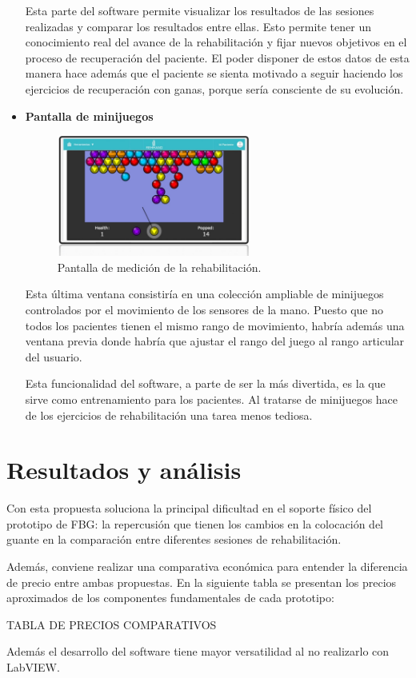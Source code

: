 \begin{itemize}
	Esta parte del software permite visualizar los resultados de las sesiones realizadas y comparar los resultados entre ellas. Esto permite tener un conocimiento real del avance de la rehabilitación y fijar nuevos objetivos en el proceso de recuperación del paciente. El poder disponer de estos datos de esta manera hace además que el paciente se sienta motivado a seguir haciendo los ejercicios de recuperación con ganas, porque sería consciente de su evolución.
	
	
	\item \textbf{Pantalla de minijuegos}
	
	\begin{figure}[H]
		\centering
		\includegraphics[width=0.6\textwidth]{./img/softwareIMU3}
		\caption{Pantalla de medición de la rehabilitación. } 
		\label{fig:softIMU3}
	\end{figure} 
	
	Esta última ventana consistiría en una colección ampliable de minijuegos controlados por el movimiento de los sensores de la mano. Puesto que no todos los pacientes tienen el mismo rango de movimiento, habría además una ventana previa donde habría que ajustar el rango del juego al rango articular del usuario.
	
	Esta funcionalidad del software, a parte de ser la más divertida, es la que sirve como entrenamiento para los pacientes. Al tratarse de minijuegos hace de los ejercicios de rehabilitación una tarea menos tediosa.
	 
	
\end{itemize}




\section{Resultados y análisis}
\label{sec:resultados4}

	Con esta propuesta soluciona la principal dificultad en el soporte físico del prototipo de FBG: la repercusión que tienen los cambios en la colocación del guante en la comparación entre diferentes sesiones de rehabilitación. 
	
	Además, conviene realizar una comparativa económica para entender la diferencia de precio entre ambas propuestas. En la siguiente tabla se presentan los precios aproximados de los componentes fundamentales de cada prototipo:
	
	
	\textcolor{rositaoscuro}{TABLA DE PRECIOS COMPARATIVOS}
	
	Además el desarrollo del software tiene mayor versatilidad al no realizarlo con LabVIEW.

